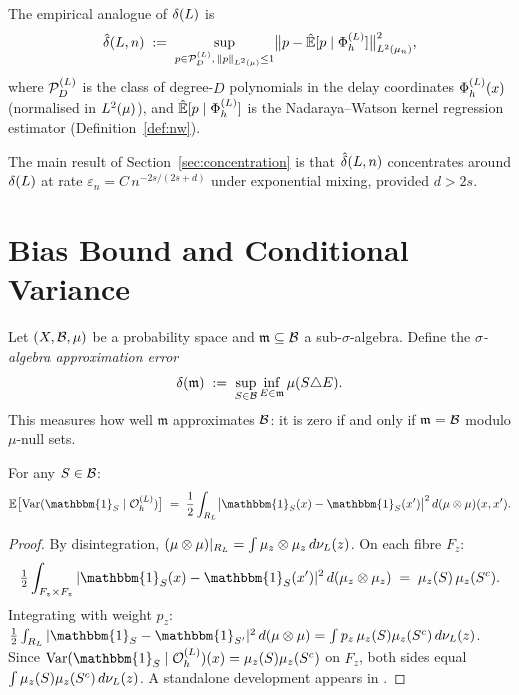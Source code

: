 The empirical analogue of $\delta(L)$ is
\[
  \hat{\delta}(L,n)
  \;:=\;
  \sup_{p \in \mathcal{P}_D^{(L)},\, \|p\|_{L^{2}(\mu)} \leq 1}
  \bigl\|p - \hat{\mathbb{E}}[p \mid \Phi_h^{(L)}]\bigr\|_{L^{2}(\mu_n)}^2,
\]
where $\mathcal{P}_D^{(L)}$ is the class of degree-$D$ polynomials in the delay coordinates
$\Phi_h^{(L)}(x)$ (normalised in $L^{2}(\mu)$), and $\hat{\mathbb{E}}[p \mid \Phi_h^{(L)}]$ is the
Nadaraya--Watson kernel regression estimator (Definition~\ref{def:nw}).

The main result of Section~\ref{sec:concentration} is that $\hat{\delta}(L,n)$
concentrates around $\delta(L)$ at rate $\varepsilon_n = C\,n^{-2s/(2s+d)}$
under exponential mixing, provided $d > 2s$.

\section{Bias Bound and Conditional Variance}
\label{sec:bias}

Let $(X, \mathcal{B}, \mu)$ be a probability space and $\mathfrak{m} \subseteq \mathcal{B}$
a sub-$\sigma$-algebra.
Define the \emph{$\sigma$-algebra approximation error}
\begin{equation}
  \delta(\mathfrak{m})
  \;:=\;
  \sup_{S \in \mathcal{B}} \inf_{E \in \mathfrak{m}} \mu(S \triangle E).
  \label{eq:delta-def}
\end{equation}
This measures how well $\mathfrak{m}$ approximates $\mathcal{B}$: it is zero if and
only if $\mathfrak{m} = \mathcal{B}$ modulo $\mu$-null sets.

\begin{lemma}
\label{lem:cond-var}
For any $S \in \mathcal{B}$:
\[
  \mathbb{E}\bigl[\mathrm{Var}(\mathbbm{1}_S \mid \OhL)\bigr]
  \;=\;
  \frac{1}{2}
  \int_{\RL}
  \bigl|\mathbbm{1}_S(x) - \mathbbm{1}_S(x')\bigr|^2
  \,d(\mu \otimes \mu)(x,x').
\]
\end{lemma}

\begin{proof}
By disintegration, $(\mu \otimes \mu)|_{R_L} = \int \mu_z \otimes \mu_z\,d\nu_L(z)$.
On each fibre $F_z$:
\[
  \tfrac{1}{2}\int_{F_z \times F_z}
    |\mathbbm{1}_S(x) - \mathbbm{1}_S(x')|^2
    \,d(\mu_z \otimes \mu_z)
  \;=\; \mu_z(S)\,\mu_z(S^c).
\]
Integrating with weight $p_z$:
$\tfrac{1}{2}\int_{\RL}|\mathbbm{1}_S - \mathbbm{1}_{S'}|^2\,d(\mu\otimes\mu)
= \int p_z\,\mu_z(S)\mu_z(S^c)\,d\nuL(z)$.
Since $\mathrm{Var}(\mathbbm{1}_S \mid \OhL)(x) = \mu_z(S)\mu_z(S^c)$ on $F_z$,
both sides equal $\int \mu_z(S)\mu_z(S^c)\,d\nu_L(z)$.
A standalone development appears in \cite{mahon_bridge}.
\end{proof}


